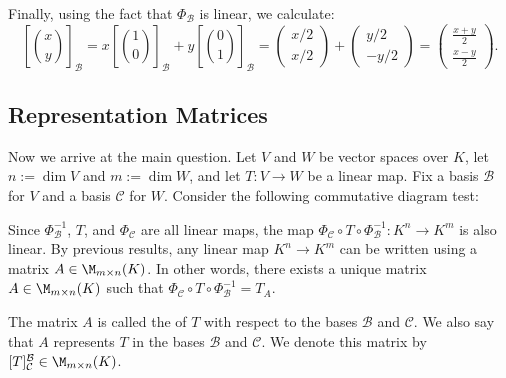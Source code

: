 \begin{example}
Finally, using the fact that $\Phi_{\mathcal{B}}$ is linear, we calculate:
\[
\left[\binom{x}{y}\right]_{\mathcal{B}} = x \left[\binom{1}{0}\right]_{\mathcal{B}} + y \left[\binom{0}{1}\right]_{\mathcal{B}} = \begin{pmatrix} x/2 \\ x/2 \end{pmatrix} + \begin{pmatrix} y/2 \\ -y/2 \end{pmatrix} = \begin{pmatrix} \frac{x+y}{2} \\ \frac{x-y}{2} \end{pmatrix}.
\]
\end{example}

\subsection{Representation Matrices}

Now we arrive at the main question. Let $V$ and $W$ be vector spaces over $K$, let $n := \dim V$ and $m := \dim W$, and let $T: V \to W$ be a linear map. Fix a basis $\mathcal{B}$ for $V$ and a basis $\mathcal{C}$ for $W$. Consider the following commutative diagram test:
\begin{center}
    \usetikzlibrary{babel}
\end{center}
Since $\Phi_{\mathcal{B}}^{-1}$, $T$, and $\Phi_{\mathcal{C}}$ are all linear maps, the map $\Phi_{\mathcal{C}} \circ T \circ \Phi_{\mathcal{B}}^{-1}: K^n \to K^m$ is also linear. By previous results, any linear map $K^n \to K^m$ can be written using a matrix $A \in \M_{m \times n}(K)$. In other words, there exists a unique matrix $A \in \M_{m \times n}(K)$ such that $\Phi_{\mathcal{C}} \circ T \circ \Phi_{\mathcal{B}}^{-1} = T_A$.

The matrix $A$ is called the  of $T$ with respect to the bases $\mathcal{B}$ and $\mathcal{C}$. We also say that $A$ represents $T$ in the bases $\mathcal{B}$ and $\mathcal{C}$. We denote this matrix by $[T]_{\mathcal{C}}^{\mathcal{B}} \in \M_{m \times n}(K)$.

